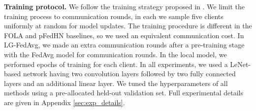 \documentclass{article}
\begin{document}
\textbf{Training protocol.} We follow the training strategy proposed in \cite{shamsian2021personalized_icml}. 
We limit the training process to  communication rounds, in each we sample five clients uniformly at random for model updates. The training procedure is different in the FOLA and pFedHN baselines, so we used an equivalent communication cost. In LG-FedAvg, we made an extra  communication rounds after a pre-training stage with the FedAvg model for  communication rounds. In the local model, we performed  epochs of training for each client. In all experiments, we used a LeNet-based network \cite{lecun1998gradient} having two convolution layers followed by two fully connected layers and an additional linear layer. We tuned the hyperparameters of all methods using a pre-allocated held-out validation set. Full experimental details are given in Appendix \ref{sec:exp_details}.
\end{document}
